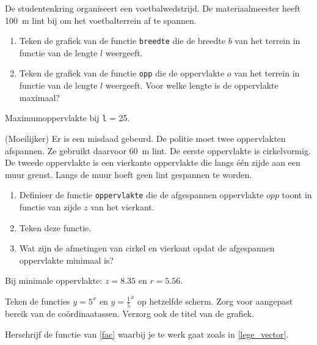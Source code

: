 \begin{oef}
De studentenkring organiseert een voetbalwedstrijd. De materiaalmeester heeft \SI{100}{\meter} lint bij om het voetbalterrein af te spannen. 
\begin{enumerate}
\item Teken de grafiek van de functie \verb/breedte/ die de breedte $b$ van het terrein in functie van de lengte $l$ weergeeft.
\item Teken de grafiek van de functie \verb/opp/ die de oppervlakte $o$ van het terrein in functie van de lengte $l$ weergeeft. Voor welke lengte is de oppervlakte maximaal?
\end{enumerate}
\begin{opl}
Maximumoppervlakte bij \verb'l' = 25.
\end{opl}
\end{oef}


\begin{oef}
(Moeilijker) Er is een misdaad gebeurd. De politie moet twee oppervlakten afspannen. Ze gebruikt daarvoor \SI{60}{\meter} lint. De eerste oppervlakte is cirkelvormig. De tweede oppervlakte is een vierkante oppervlakte die langs \'e\'en zijde aan een muur grenst. Langs de muur hoeft geen lint gespannen te worden. 
\begin{enumerate}
\item Definieer de functie \verb/oppervlakte/ die de afgespannen oppervlakte $opp$ toont in functie van zijde $z$ van het vierkant.
\item Teken deze functie.
\item Wat zijn de afmetingen van cirkel en vierkant opdat de afgespannen oppervlakte minimaal is?
\end{enumerate}
\begin{opl}
Bij minimale oppervlakte: $z = 8.35$ en $r = 5.56$.
\end{opl}
\end{oef}


\begin{oef}
Teken de functies $y = 5^x$ en $y = \frac15^x$ op hetzelfde scherm. 
Zorg voor aangepast bereik van de co\"ordinaatassen. Verzorg ook de titel van de grafiek.
\end{oef} 


\begin{oef}
Herschrijf de functie van \cref{fac} waarbij je te werk gaat zoals in \cref{lege_vector}.
\end{oef}


